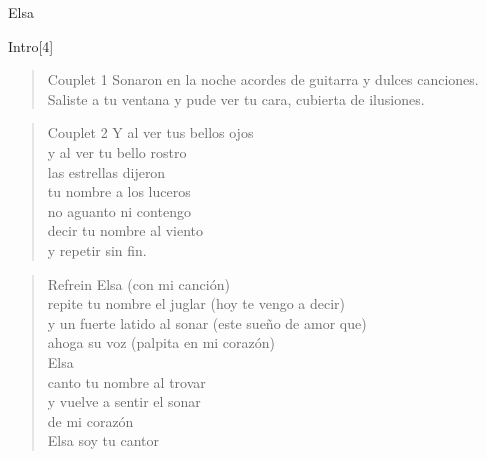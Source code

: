 \begin{song}[tango]{Elsa}
\begin{instrumental}{Intro}[4]
 \measure{}  \measure{}
 \measure{}  \measure{}
 \measure{}  \measure{}
 \measure{} 
\end{instrumental}

\begin{verse}{Couplet 1}
Sonaron en la noche 
acordes de guitarra 
y dulces canciones.\\
Saliste a tu ventana 
y pude ver tu cara, 
cubierta de ilusiones.
\end{verse}

\begin{verse}{Couplet 2}
Y al ver tus bellos ojos\\
y al ver tu bello rostro\\
las estrellas dijeron \\
tu nombre a los luceros\\
no aguanto ni contengo\\
decir tu nombre al viento\\
y repetir sin fin. 
\end{verse}


\begin{verse}{Refrein}
\hspace{3em}Elsa   (con mi canción)\\
repite tu nombre el juglar  (hoy te vengo a decir)\\
y un fuerte latido al sonar  (este sueño de amor que)\\
ahoga su voz   (palpita en mi corazón)\\
  
\hspace{3em} Elsa\\
canto tu nombre al trovar\\
y vuelve a sentir el sonar\\
de mi corazón \\

\hspace{3em} Elsa soy tu cantor
\end{verse}


\end{song}
